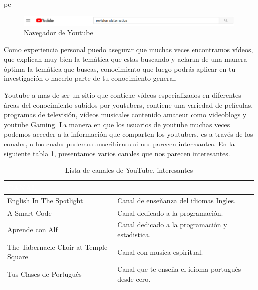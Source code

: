 pc\documentclass[a4paper,12pt,openany]{book}
\begin{document}
\begin{figure}[ht]
  \centering
	\includegraphics[width=14cm]{youtube1.png}
\caption{Navegador de Youtube}
  \label{fig:youtube1}
\end{figure}

Como experiencia personal puedo asegurar que muchas veces encontramos vídeos, que explican muy bien la temática que estas buscando y aclaran de una manera óptima la temática que buscas, conocimiento que luego podrás aplicar en tu investigación o hacerlo parte de tu conocimiento general.   

Youtube a mas de ser un sitio que contiene vídeos especializados en diferentes áreas del conocimiento subidos por youtubers, contiene una variedad de películas, programas de televisión, vídeos musicales contenido amateur como videoblogs y youtube Gaming. La manera en que los usuarios de youtube muchas veces podemos acceder a la información que comparten los youtubers, es a través de los canales, a los cuales podemos suscribirnos si nos parecen interesantes. En la siguiente tabla \ref{tabla:tabYou}, presentamos varios canales que nos parecen interesantes.

\begin{table}[ht]
\begin{center}

\begin{tabular}{| m{6 cm}| m{10 cm} |}
\hline
\rowcolor[cmyk]{1,1,0,0} {\textcolor{white}{\centering CANAL}} & {\textcolor{white}{\centering {\centering INFORMACIÓN}} \\ \hline 
English In The Spotlight & Canal de enseñanza del idiomas Ingles.\\ \hline
A Smart Code & Canal dedicado a la programación.  \\ \hline
Aprende con Alf & Canal dedicado a la programación y estadistica.  \\ \hline
The Tabernacle Choir at Temple Square  & Canal con musica espiritual.  \\ \hline
Tus Clases de Portugués & Canal que te enseña el idioma portugués desde cero.  \\ \hline
\end{tabular}
\caption{Lista de canales de YouTube, interesantes}
\label{tabla:tabYou}
\end{center}
\end{table} 
\end{document}
